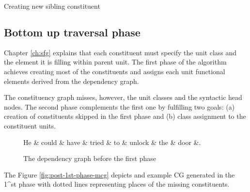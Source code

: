 \begin{algorithm}[H]
	\Input { \cgPointer, \Children, \elementType, \edge, \dg, \cg}
	\caption{Creating new sibling constituent}
	\label{alg:create-new-sibling}
\end{algorithm}

\subsection{Bottom up traversal phase}
Chapter \ref{ch:sfg} explains that each constituent must specify the unit class and the element it is filling within parent unit. The first phase of the algorithm achieves creating most of the constituents and assigns each unit functional elements derived from the dependency graph. 

The constituency graph misses, however, the unit classes and the syntactic head nodes. The second phase complements the first one by fulfilling two goals: (a) creation of constituents skipped in the first phase and (b) class assignment to the constituent units.
\begin{figure}[H]
	\centering
	\begin{dependency}
		\begin{deptext}[]
			He \& could \& have \& tried \& to \& unlock \& the \& door \&. \\
		\end{deptext}
	\end{dependency}
	\caption{The dependency graph before the first phase}
	\label{fig:dep-example1}
\end{figure}

The Figure \ref{fig:post-1st-phase-mcg} depicts and example CG generated in the 1^{st} phase with dotted lines representing places of the missing constituents. 

